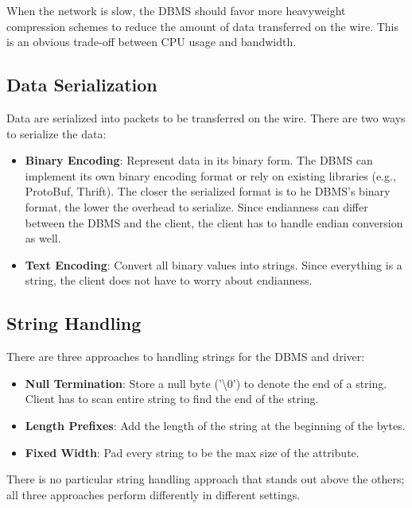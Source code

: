 \documentclass[11pt]{article}
\begin{document}
When the network is slow, the DBMS should favor more heavyweight compression schemes to reduce the amount of data transferred on the wire. This is an obvious trade-off between CPU usage and bandwidth.

\subsection*{Data Serialization}
Data are serialized into packets to be transferred on the wire. There are two ways to serialize the data:
\begin{itemize}
    \item \textbf{Binary Encoding}: Represent data in its binary form. The DBMS can implement its own binary encoding format or rely on existing libraries (e.g., ProtoBuf, Thrift). The closer the serialized format is to he DBMS's binary format, the lower the overhead to serialize. Since endianness can differ between the DBMS and the client, the client has to handle endian conversion as well. 
    \item \textbf{Text Encoding}: Convert all binary values into strings. Since everything is a string, the client does not have to worry about endianness.
\end{itemize}

\subsection*{String Handling}
There are three approaches to handling strings for the DBMS and driver:
\begin{itemize}
    \item \textbf{Null Termination}: Store a null byte ('\textbackslash 0') to denote the end of a string. Client has to scan entire string to find the end of the string.
    \item \textbf{Length Prefixes}: Add the length of the string at the beginning of the bytes.
    \item \textbf{Fixed Width}: Pad every string to be the max size of the attribute.
\end{itemize}
There is no particular string handling approach that stands out above the others; all three approaches perform differently in different settings.
\end{document}
